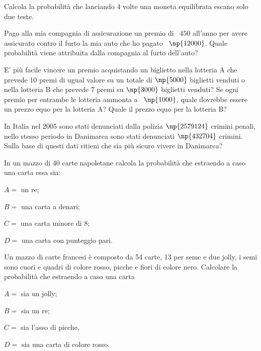 \begin{esercizio}[\Ast]
 \label{ese:9.16}
Calcola la probabilità che lanciando 4 volte una moneta equilibrata escano solo due teste.
\end{esercizio}

\begin{esercizio}[\Ast]
 \label{ese:9.17}
Pago alla mia compagnia di assicurazione un premio di \officialeuro~$450$ all'anno per avere assicurato contro il furto la mia auto che ho pagato \officialeuro~$\np{12000}$. Quale probabilità viene attribuita dalla compagnia al furto dell'auto?
\end{esercizio}

\begin{esercizio}[\Ast]
 \label{ese:9.18}
E' più facile vincere un premio acquistando un biglietto nella lotteria A che prevede 10 premi di ugual valore su un totale di $\np{5000}$ biglietti venduti o nella lotteria B che prevede 7 premi su $\np{3000}$ biglietti venduti?
Se ogni premio per entrambe le lotteria ammonta a \officialeuro~$\np{1000}$, quale dovrebbe essere un prezzo equo per la lotteria A? Quale il prezzo equo per la lotteria B?
\end{esercizio}

\begin{esercizio}
 \label{ese:9.19}
In Italia nel 2005 sono stati denunciati dalla polizia $\np{2579124}$ crimini penali, nello stesso periodo in Danimarca sono stati denunciati $\np{432704}$ crimini. Sulla base di questi dati ritieni che sia più sicuro vivere in Danimarca?
\end{esercizio}

\begin{esercizio}
 \label{ese:9.20}
 In un mazzo di 40 carte napoletane calcola la probabilità che estraendo a caso una carta essa sia:
\begin{itemize*}
\item $ A= $ un re;
\item $ B= $ una carta a denari;
\item $ C= $ una carta minore di 8;
\item $ D = $ una carta con punteggio pari.
\end{itemize*}
\end{esercizio}

\begin{esercizio}
 \label{ese:9.21}
Un mazzo di carte francesi è composto da 54 carte, 13 per seme e due jolly, i semi sono cuori e quadri di colore rosso, picche e fiori di colore nero. Calcolare la probabilità che estraendo a caso una carta
\begin{itemize*}
\item $ A= $ sia un jolly;
\item $ B= $ sia un re;
\item $ C= $ sia l'asso di picche,
\item $ D= $ sia una carta di colore rosso.
\end{itemize*}
\end{esercizio}

